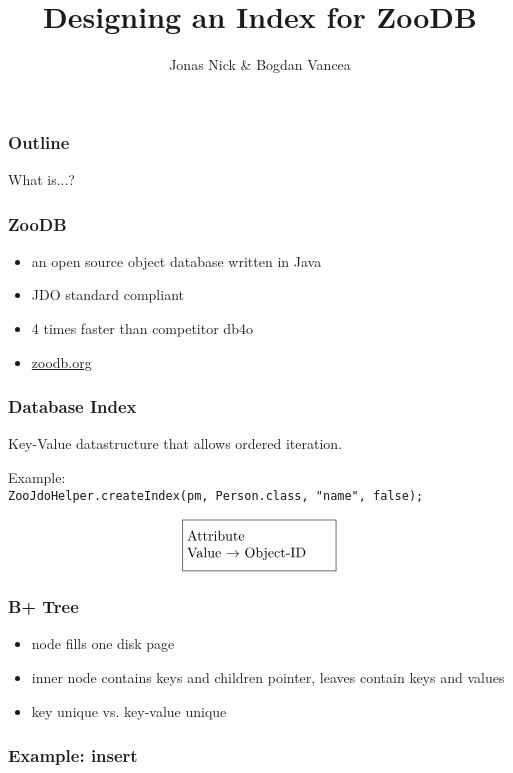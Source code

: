 \documentclass{beamer}
\title{Designing an Index for ZooDB}
\author{Jonas Nick \& Bogdan Vancea}
\begin{document}
  \frame{\titlepage}
  \begin{frame}
    \frametitle{Outline}
    \tableofcontents[hideallsubsections]
  \end{frame}

  \begin{section}{What is...?}
    \begin{frame}
      \frametitle{ZooDB}
      \begin{itemize}
        \item an open source object database written in Java
        \item JDO standard compliant
        \item 4 times faster than competitor db4o
        \item \url{zoodb.org}
      \end{itemize}

    \end{frame}
    \begin{frame}
      \frametitle{Database Index}
      \begin{block}{}
          Key-Value datastructure that allows ordered iteration.
      \end{block}
      \vspace{1em}
      \pause
      Example: \\
      \texttt{ZooJdoHelper.createIndex(pm, Person.class, "name", false);}
      \pause
      \begin{align*}
      \fbox{\parbox[t][3em][c]{0.29\textwidth}{Attribute \\ Value $\rightarrow$ Object-ID} }
      \end{align*}
      \pause
      \begin{center}
      \end{center}
    \end{frame}
    \begin{frame}
      \frametitle{B+ Tree}
      \begin{itemize}
        \item node fills one disk page
        \item inner node contains keys and children pointer, leaves contain keys and values
        \item key unique vs. key-value unique
      \end{itemize}
    \end{frame}
    \begin{frame}
      \frametitle{Example: insert}
    \end{frame}
  \end{section}
\end{document}
